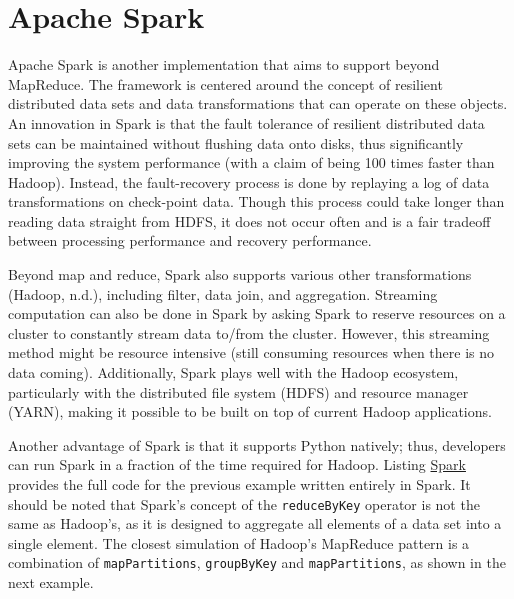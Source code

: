 \documentclass[]{krantz}
\begin{document}
\section{Apache Spark}\label{apache-spark}

Apache Spark is another implementation that aims to support beyond
MapReduce. The framework is centered around the concept of resilient
distributed data sets and data transformations that can operate on these
objects. An innovation in Spark is that the fault tolerance of resilient
distributed data sets can be maintained without flushing data onto
disks, thus significantly improving the system performance (with a claim
of being 100 times faster than Hadoop). Instead, the fault-recovery
process is done by replaying a log of data transformations on
check-point data. Though this process could take longer than reading
data straight from HDFS, it does not occur often and is a fair tradeoff
between processing performance and recovery performance.

Beyond map and reduce, Spark also supports various other transformations
(Hadoop, n.d.), including filter, data join, and aggregation. Streaming
computation can also be done in Spark by asking Spark to reserve
resources on a cluster to constantly stream data to/from the cluster.
However, this streaming method might be resource intensive (still
consuming resources when there is no data coming). Additionally, Spark
plays well with the Hadoop ecosystem, particularly with the distributed
file system (HDFS) and resource manager (YARN), making it possible to be
built on top of current Hadoop applications.

Another advantage of Spark is that it supports Python natively; thus,
developers can run Spark in a fraction of the time required for Hadoop.
Listing \protect\hyperlink{list:parallel4}{Spark} provides the full code
for the previous example written entirely in Spark. It should be noted
that Spark's concept of the \texttt{reduceByKey} operator is not the
same as Hadoop's, as it is designed to aggregate all elements of a data
set into a single element. The closest simulation of Hadoop's MapReduce
pattern is a combination of \texttt{mapPartitions}, \texttt{groupByKey}
and \texttt{mapPartitions}, as shown in the next example.
\end{document}
